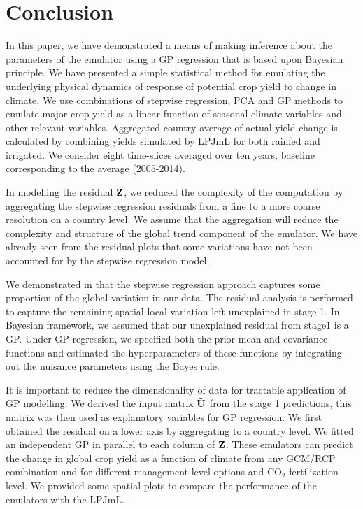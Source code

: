 \section{Conclusion}
In this paper, we have demonstrated a means of making inference about the parameters of the emulator using a GP regression that is based upon Bayesian principle. We have presented a simple statistical method for emulating the underlying physical dynamics of response of potential crop yield to change in climate. We use combinations of stepwise regression, PCA and GP methods to emulate major crop-yield as a linear function of seasonal climate variables and other relevant variables. Aggregated country average of actual yield change is calculated by combining yields simulated by LPJmL for both rainfed and irrigated. We consider eight time-slices averaged over ten years, baseline corresponding to the average (2005-2014). 

In modelling the residual ${\bf Z}$, we reduced the complexity of the computation by aggregating the stepwise regression residuals from a fine to a more coarse resolution on a country level. We assume that the aggregation will reduce the complexity and structure of the global trend component of the emulator. We have already seen from the residual plots that some variations have not been accounted for by the stepwise regression model.

We demonstrated in \cite{qwole} that the stepwise regression approach captures some proportion of the global variation in our data. The residual analysis is performed to capture the remaining spatial local variation left unexplained in stage 1. In Bayesian framework, we assumed that our unexplained residual from stage1 is a GP. Under GP regression, we specified both the prior mean and covariance functions and estimated the hyperparameters of these functions by integrating out the nuisance parameters using the Bayes rule. 

It is important to reduce the dimensionality of data for tractable application of GP modelling. We derived the input matrix ${\tilde {\bf U}}$ from the stage 1 predictions, this matrix was then used as explanatory variables for GP regression. We first obtained the residual on a lower axis by aggregating to a country level. We fitted an independent GP in parallel to each column of $\bf Z$. These emulators can predict the change in global crop yield as a function of climate from any GCM/RCP combination and for different management level options and CO$_2$ fertilization level. We provided some spatial plots to compare the performance of the emulators with the LPJmL.

